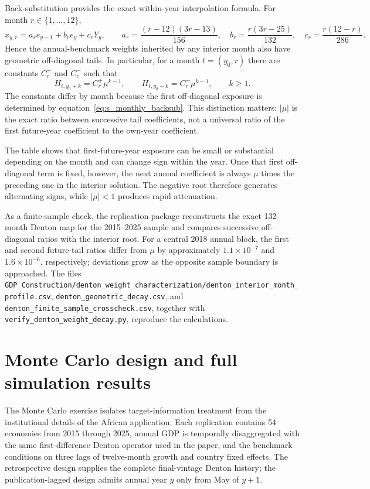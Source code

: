 \documentclass[12pt]{article}
\begin{document}
Back-substitution provides the exact within-year interpolation formula. For month $r\in\{1,\ldots,12\}$,
\begin{equation}
x_{y,r}
= a_r e_{y-1}+b_r e_y+c_rY_y,
\qquad
a_r=\frac{(r-12)(3r-13)}{156},\quad
b_r=\frac{r(3r-25)}{132},\quad
c_r=\frac{r(12-r)}{286}.
\label{eq:s_monthly_backsub}
\end{equation}
Hence the annual-benchmark weights inherited by any interior month also have geometric off-diagonal tails. In particular, for a month $t=(y_0,r)$ there are constants $C_r^+$ and $C_r^-$ such that
\[
H_{t,y_0+k}=C_r^+\mu^{k-1},\qquad
H_{t,y_0-k}=C_r^-\mu^{k-1},\qquad k\geq1.
\]
The constants differ by month because the first off-diagonal exposure is determined by equation~\eqref{eq:s_monthly_backsub}. This distinction matters: $|\mu|$ is the exact ratio between successive tail coefficients, not a universal ratio of the first future-year coefficient to the own-year coefficient.



The table shows that first-future-year exposure can be small or substantial depending on the month and can change sign within the year. Once that first off-diagonal term is fixed, however, the next annual coefficient is always $\mu$ times the preceding one in the interior solution. The negative root therefore generates alternating signs, while $|\mu|<1$ produces rapid attenuation.

As a finite-sample check, the replication package reconstructs the exact 132-month Denton map for the 2015--2025 sample and compares successive off-diagonal ratios with the interior root. For a central 2018 annual block, the first and second future-tail ratios differ from $\mu$ by approximately $1.1\times10^{-7}$ and $1.6\times10^{-6}$, respectively; deviations grow as the opposite sample boundary is approached. The files \nolinkurl{GDP_Construction/denton_weight_characterization/denton_interior_month_profile.csv}, \nolinkurl{denton_geometric_decay.csv}, and \nolinkurl{denton_finite_sample_crosscheck.csv}, together with \nolinkurl{verify_denton_weight_decay.py}, reproduce the calculations.

\section{Monte Carlo design and full simulation results}
The Monte Carlo exercise isolates target-information treatment from the institutional details of the African application. Each replication contains 54 economies from 2015 through 2025, annual GDP is temporally disaggregated with the same first-difference Denton operator used in the paper, and the benchmark conditions on three lags of twelve-month growth and country fixed effects. The retrospective design supplies the complete final-vintage Denton history; the publication-lagged design admits annual year $y$ only from May of $y+1$.
\end{document}
